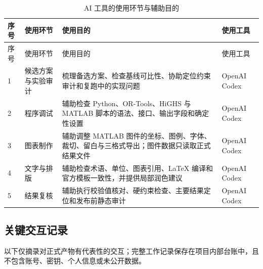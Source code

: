 \begin{longtable}{@{}p{}p{}p{}p{}@{}}
\caption{AI 工具的使用环节与辅助目的}\label{tab:ai-purpose}\\
\toprule
序号 & 使用环节 & 使用目的 & 使用工具 \\
\midrule
\endfirsthead
\toprule
序号 & 使用环节 & 使用目的 & 使用工具 \\
\midrule
\endhead
1 & 候选方案与实验审计 & 梳理备选方案、检查基线可比性、协助定位约束审计和复跑中的实现问题 & OpenAI Codex \\
2 & 程序调试 & 辅助检查 Python、OR-Tools、HiGHS 与 MATLAB 脚本的语法、接口、输出字段和确定性设置 & OpenAI Codex \\
3 & 图表制作 & 辅助调整 MATLAB 图件的坐标、图例、字体、裁切、留白与三格式导出；图件数据只读取正式结果文件 & OpenAI Codex \\
4 & 文字与排版 & 辅助检查术语、单位、图表引用、LaTeX 编译和官方模板一致性，并提供局部润色建议 & OpenAI Codex \\
5 & 结果复核 & 辅助执行校验值核对、硬约束检查、主要结果定位和发布前静态审计 & OpenAI Codex \\
\bottomrule
\end{longtable}

\clearpage
\subsection{关键交互记录}

以下仅摘录对正式产物有代表性的交互；完整工作记录保存在项目内部台账中，且不包含账号、密钥、个人信息或未公开数据。

